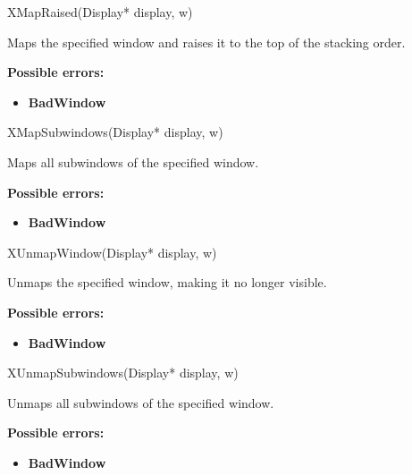 \documentclass{report}
\begin{document}
\begin{itemize}
            \begin{cppcode}
                XMapRaised(Display* display, w)
            \end{cppcode}
            \bigbreak \noindent
            Maps the specified window and raises it to the top of the stacking order.

            \bigbreak \noindent
            \textbf{Possible errors:}
            \begin{itemize}
                \item \textbf{BadWindow}
            \end{itemize}

            \begin{cppcode}
                XMapSubwindows(Display* display, w)
            \end{cppcode}
            \bigbreak \noindent
            Maps all subwindows of the specified window.

            \bigbreak \noindent
            \textbf{Possible errors:}
            \begin{itemize}
                \item \textbf{BadWindow}
            \end{itemize}

            \begin{cppcode}
                XUnmapWindow(Display* display, w)
            \end{cppcode}
            \bigbreak \noindent
            Unmaps the specified window, making it no longer visible.

            \bigbreak \noindent
            \textbf{Possible errors:}
            \begin{itemize}
                \item \textbf{BadWindow}
            \end{itemize}

            \begin{cppcode}
                XUnmapSubwindows(Display* display, w)
            \end{cppcode}
            \bigbreak \noindent
            Unmaps all subwindows of the specified window.

            \bigbreak \noindent
            \textbf{Possible errors:}
            \begin{itemize}
                \item \textbf{BadWindow}
            \end{itemize}


\end{itemize}
\end{document}
